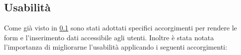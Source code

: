 \subsection{Usabilità}
\label{form-usabilita}
Come già visto in \ref{form-usabilita} sono stati adottati specifici accorgimenti per rendere le form e l'inserimento dati accessibile agli utenti. Inoltre è stata notata l'importanza di migliorarne l'usabilità applicando i seguenti accorgimenti: %
